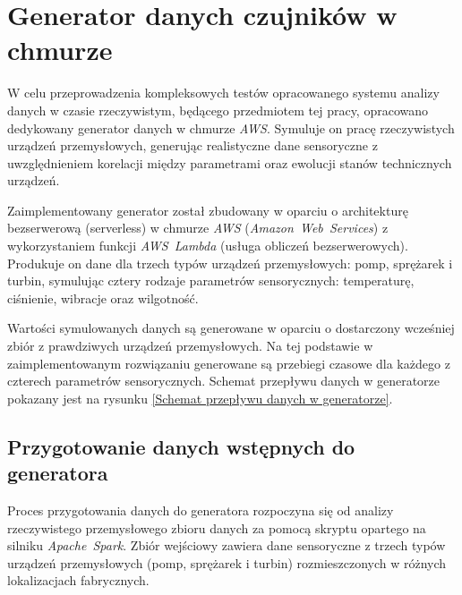 \section{Generator danych czujników w chmurze}
\label{sec:implementacja_generowania}


W celu przeprowadzenia kompleksowych testów opracowanego systemu analizy danych w czasie rzeczywistym, będącego przedmiotem tej pracy, opracowano dedykowany generator danych w chmurze \textit{AWS}. Symuluje on pracę rzeczywistych urządzeń przemysłowych, generując realistyczne dane sensoryczne z uwzględnieniem korelacji między parametrami oraz ewolucji stanów technicznych urządzeń.

Zaimplementowany generator został zbudowany w oparciu o architekturę bezserwerową (serverless) w chmurze \textit{AWS} (\mbox{\textit{Amazon Web Services}}) z wykorzystaniem funkcji \mbox{\textit{AWS Lambda}} (usługa obliczeń bezserwerowych). Produkuje on dane dla trzech typów urządzeń przemysłowych: pomp, sprężarek i turbin, symulując cztery rodzaje parametrów sensorycznych: temperaturę, ciśnienie, wibracje oraz wilgotność.

Wartości symulowanych danych są generowane w oparciu o dostarczony wcześniej zbiór z prawdziwych urządzeń przemysłowych. Na tej podstawie w zaimplementowanym rozwiązaniu generowane są przebiegi czasowe dla każdego z czterech parametrów sensorycznych. Schemat przepływu danych w generatorze pokazany jest na rysunku \ref{Schemat przepływu danych w generatorze}.


\subsection{Przygotowanie danych wstępnych do generatora}

Proces przygotowania danych do generatora rozpoczyna się od analizy rzeczywistego przemysłowego zbioru danych za pomocą skryptu opartego na silniku \mbox{\textit{Apache Spark}}. Zbiór wejściowy zawiera dane sensoryczne z trzech typów urządzeń przemysłowych (pomp, sprężarek i turbin) rozmieszczonych w różnych lokalizacjach fabrycznych.

